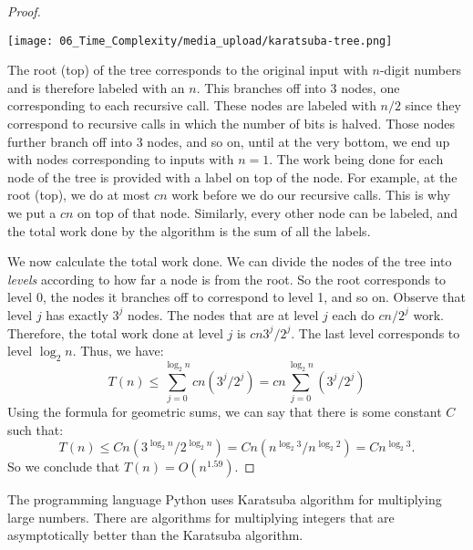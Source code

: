 \begin{flex}
\begin{proof}
\begin{center}
\texttt{[image: 06\_Time\_Complexity/media\_upload/karatsuba-tree.png]}
\end{center}

The root (top) of the tree corresponds to the original input with $n$-digit numbers and is therefore labeled with an $n$. This branches off into 3 nodes, one corresponding to each recursive call. These nodes are labeled with $n/2$ since they correspond to recursive calls in which the number of bits is halved. Those nodes further branch off into 3 nodes, and so on, until at the very bottom, we end up with nodes corresponding to inputs with $n = 1$. The work being done for each node of the tree is provided with a label on top of the node. For example, at the root (top), we do at most $cn$ work before we do our recursive calls. This is why we put a $cn$ on top of that node. Similarly, every other node can be labeled, and the total work done by the algorithm is the sum of all the labels. 

We now calculate the total work done. We can divide the nodes of the tree into \emph{levels} according to how far a node is from the root. So the root corresponds to level 0, the nodes it branches off to correspond to level 1, and so on. Observe that level $j$ has exactly $3^j$ nodes. The nodes that are at level $j$ each do $cn/2^j$ work. Therefore, the total work done at level $j$ is $cn3^j/2^j$. The last level corresponds to level $\log_2 n$. Thus, we have:
\[
T(n) \leq \sum_{j = 0}^{\log_2 n} cn (3^j/2^j) = cn \sum_{j=0}^{\log_2 n} (3^j/2^j)
\]
Using the formula for geometric sums, we can say that there is some constant $C$ such that:
\[
T(n) \leq Cn (3^{\log_2 n} / 2^{\log_2 n}) = Cn (n^{\log_2 3} / n^{\log_2 2}) = C n^{\log_2 3}.
\]
So we conclude that $T(n) = O(n^{1.59})$.

\end{proof}
\end{flex}

\begin{remark}
\label{rmrk:time-complexity::programming}
The programming language Python uses Karatsuba algorithm for multiplying large numbers. There are algorithms for multiplying integers that are asymptotically better than the Karatsuba algorithm.

\end{remark}

